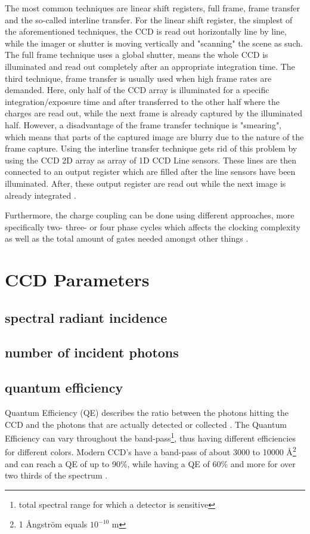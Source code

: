  The most common techniques are linear shift registers, full frame, frame transfer and the so-called interline transfer.
 For the linear shift register, the simplest of the aforementioned techniques, the CCD is read out horizontally line by line, while the imager or shutter is moving vertically and "scanning" the scene as such.
 The full frame technique uses a global shutter, means the whole CCD is illuminated and read out completely after an appropriate integration time. 
 The third technique, frame transfer is usually used when high frame rates are demanded. Here, only half of the CCD array is illuminated for a specific integration/exposure time and after transferred to the other half where the charges are read out, while the next frame is already captured by the illuminated half.
 However, a disadvantage of the frame transfer technique is "smearing", which means that parts of the captured image are blurry due to the nature of the frame capture.
 Using the interline transfer technique gets rid of this problem by using the CCD 2D array as array of 1D CCD Line sensors. These lines are then connected to an output register which are filled after the line sensors have been illuminated. After, these output register are read out while the next image is already integrated \citep{hoymorksensors}.
 
 Furthermore, the charge coupling can be done using different approaches, more specifically two- three- or four phase cycles which affects the clocking complexity as well as the total amount of gates needed amongst other things \citep{ccdimaging}.
 



\section{CCD Parameters}

\subsection{spectral radiant incidence}

\subsection{number of incident photons}

\subsection{quantum efficiency}
Quantum Efficiency (QE) describes the ratio between the photons hitting the CCD and the photons that are actually detected or collected \citep{hoymorksensors}. The Quantum Efficiency can vary throughout the band-pass\footnote{total spectral range for which a detector is sensitive}, thus having different efficiencies for different colors. Modern CCD's have a band-pass of about 3000 to 10000 Å\footnote{1 {Ångström} equals $10^{-10}$ m} and can reach a QE of up to 90\%, while having a QE of 60\% and more for over two thirds of the spectrum \citep{howellCCD}.

